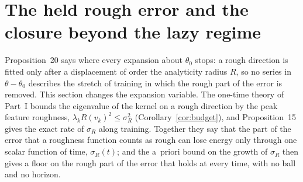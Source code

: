%

\section{The held rough error and the closure beyond the lazy regime}
\label{sec:held-rough}

Proposition~20 says where every expansion about $\theta_0$ stops: a rough
direction is fitted only after a displacement of order the analyticity radius
$R$, so no series in $\theta-\theta_0$ describes the stretch of training in
which the rough part of the error is removed. This section changes the
expansion variable. The one-time theory of Part~I bounds the eigenvalue of the
kernel on a rough direction by the peak feature roughness,
$\lambda_k R(v_k)^2 \le \sigma_R^2$ (Corollary~\ref{cor:budget}), and
Proposition~15 gives the exact rate of $\sigma_R$ along training. Together
they say that the part of the error that a roughness function counts as rough
can lose energy only through one scalar function of time, $\sigma_R(t)$; and
the a~priori bound on the growth of $\sigma_R$ then gives a floor on the rough
part of the error that holds at every time, with no ball and no horizon.

